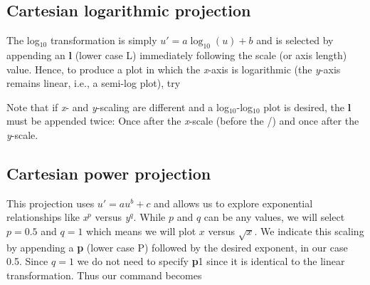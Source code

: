 
\subsection{Cartesian logarithmic projection}


The log$_{10}$ transformation is simply $u' = a \log_{10}(u) + b$ and is selected by appending an \textbf{l}
(lower case L) immediately following the scale (or axis length)
value.  Hence, to produce a plot in which the {\it x}-axis is
logarithmic (the {\it y}-axis remains linear, i.e., a semi-log plot), try 


\par Note that if {\it x}- and {\it y}-scaling are different and
a log$_{10}$-log$_{10}$ plot is desired, the \textbf{l} must be
appended twice: Once after the {\it x}-scale (before the /) and
once after the {\it y}-scale. 


\subsection{Cartesian power projection}


This projection uses $u' = a u^b + c$ and allows us to explore exponential relationships like {\it x$^p$} versus {\it y$^q$}.
While $p$ and $q$ can be any values, we will select $p
= 0.5$ and $q = 1$ which means we will plot $x$ versus $\sqrt{x}$.
We indicate this scaling by appending a \textbf{p} (lower case P) followed
by the desired exponent, in our case 0.5.  Since $q = 1$ we do not
need to specify \textbf{p}1 since it is identical to the linear transformation.
Thus our command becomes

